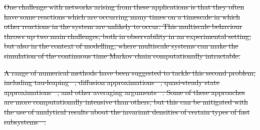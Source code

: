 \documentclass[final]{siamltex}
\providecommand{\DIFdel}[1]{{\protect\color{red}\sout{#1}}}                      %
\providecommand{\DIFdelbegin}{} %
\providecommand{\DIFdelend}{} %
\newcommand{\DIFscaledelfig}{0.5}
\newlength{\DIFdelgraphicswidth} %
\newlength{\DIFdelgraphicsheight} %
\newcommand{\DIFdelincludegraphics}[2][]{%
\sbox{\DIFdelgraphicsbox}{\DIFOincludegraphics[#1]{#2}}%
\settoboxwidth{\DIFdelgraphicswidth}{\DIFdelgraphicsbox} %
\settoboxtotalheight{\DIFdelgraphicsheight}{\DIFdelgraphicsbox} %
\scalebox{\DIFscaledelfig}{%
\parbox[b]{\DIFdelgraphicswidth}{\usebox{\DIFdelgraphicsbox}\\[-\baselineskip] \rule{\DIFdelgraphicswidth}{0em}}\llap{\resizebox{\DIFdelgraphicswidth}{\DIFdelgraphicsheight}{%
\setlength{\unitlength}{\DIFdelgraphicswidth}%
\begin{picture}(1,1)%
\thicklines\linethickness{2pt} %
{\color[rgb]{1,0,0}\put(0,0){\framebox(1,1){}}}%
{\color[rgb]{1,0,0}\put(0,0){\line( 1,1){1}}}%
{\color[rgb]{1,0,0}\put(0,1){\line(1,-1){1}}}%
\end{picture}%
}\hspace*{3pt}}} %
} %
\DeclareRobustCommand{\DIFdelbegin}{\DIFOdelbegin \let\includegraphics\DIFdelincludegraphics} %
\DeclareRobustCommand{\DIFdelend}{\DIFOaddend \let\includegraphics\DIFOincludegraphics} %
\begin{document}
\DIFdelbegin \DIFdel{One challenge with networks arising from these applications is that
they often have some reactions which are occurring many times on a
timescale in which other reactions in the system are unlikely to
occur. This multiscale behaviour throws up two main challenges, both
in observability in an experimental setting, but also in the context
of modelling, where multiscale systems can make the simulation of the
continuous time Markov chain computationally intractable.
}\DIFdelend %

\DIFdelbegin \DIFdel{A range of numerical methods have been suggested to tackle this second
problem, including tau-leaping\mbox{%
\cite{rathinam2003stiffness,cao2006efficient}}\hspace{0pt}%
, diffusion approximations\mbox{%
\cite{erban2006gene,cotter2011constrained,cotter2016error}}\hspace{0pt}%
, quasi-steady state
approximations\mbox{%
\cite{weinan2007nested,cao2005slow}}\hspace{0pt}%
, and other averaging
arguments\mbox{%
\cite{cotter2016constrained}}\hspace{0pt}%
. Some of these approaches are more
computationally intensive than others, but this can be mitigated with the
use of analytical results about the invariant densities of certain
types of fast subsystems\mbox{%
\cite{jahnke2007solving,anderson2010product,anderson2016product}}\hspace{0pt}%
.
}\DIFdelend %
\end{document}

